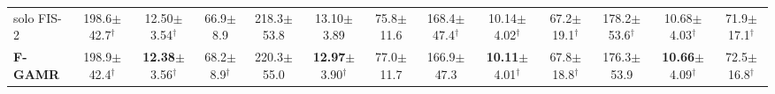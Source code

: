 \begin{table}[!t]
\begin{tabular}{l|ccc|ccc|ccc|ccc}
solo FIS-2 & 198.6{\tiny$\pm$42.7}$^\dagger$ & 12.50{\tiny$\pm$3.54}$^\dagger$ & 66.9{\tiny$\pm$8.9} & 218.3{\tiny$\pm$53.8} & 13.10{\tiny$\pm$3.89} & 75.8{\tiny$\pm$11.6} & 168.4{\tiny$\pm$47.4}$^\dagger$ & 10.14{\tiny$\pm$4.02}$^\dagger$ & 67.2{\tiny$\pm$19.1}$^\dagger$ & 178.2{\tiny$\pm$53.6}$^\dagger$ & 10.68{\tiny$\pm$4.03}$^\dagger$ & 71.9{\tiny$\pm$17.1}$^\dagger$ \\
\textbf{F-GAMR} & 198.9{\tiny$\pm$42.4}$^\dagger$ & \textbf{12.38}{\tiny$\pm$3.56}$^\dagger$ & 68.2{\tiny$\pm$8.9}$^\dagger$ & 220.3{\tiny$\pm$55.0} & \textbf{12.97}{\tiny$\pm$3.90}$^\dagger$ & 77.0{\tiny$\pm$11.7} & 166.9{\tiny$\pm$47.3} & \textbf{10.11}{\tiny$\pm$4.01}$^\dagger$ & 67.8{\tiny$\pm$18.8}$^\dagger$ & 176.3{\tiny$\pm$53.9} & \textbf{10.66}{\tiny$\pm$4.09}$^\dagger$ & 72.5{\tiny$\pm$16.8}$^\dagger$ \\
\bottomrule
\end{tabular}
\end{table}